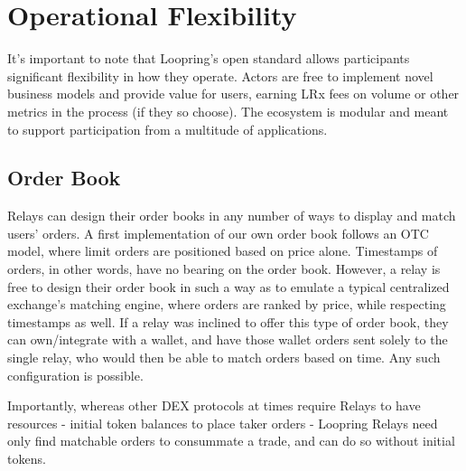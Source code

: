 \documentclass[UTF8,nofonts]{article}
\makeatletter
\newenvironment{figurehere}
 {\def\@captype{figure}}
 {}
\makeatother
\begin{document}
\begin{multicols}{2}
\begin{enumerate}
\end{enumerate}





%
%
%

\section{Operational Flexibility\label{sec:business_model}}
It's important to note that Loopring's open standard allows participants significant flexibility in how they operate. Actors are free to implement novel business models and provide value for users, earning LRx fees on volume or other metrics in the process (if they so choose). The ecosystem is modular and meant to support participation from a multitude of applications.


\subsection{Order Book\label{sec:order_book}}
Relays can design their order books in any number of ways to display and match users' orders. A first implementation of our own order book follows an OTC model, where limit orders are positioned based on price alone. Timestamps of orders, in other words, have no bearing on the order book. However, a relay is free to design their order book in such a way as to emulate a typical centralized exchange's matching engine, where orders are ranked by price, while respecting timestamps as well. If a relay was inclined to offer this type of order book, they can own/integrate with a wallet, and have those wallet orders sent solely to the single relay, who would then be able to match orders based on time. Any such configuration is possible.


Importantly, whereas other DEX protocols at times require Relays to have resources - initial token balances to place taker orders - Loopring Relays need only find matchable orders to consummate a trade, and can do so without initial tokens.


\end{multicols}
\end{document}
